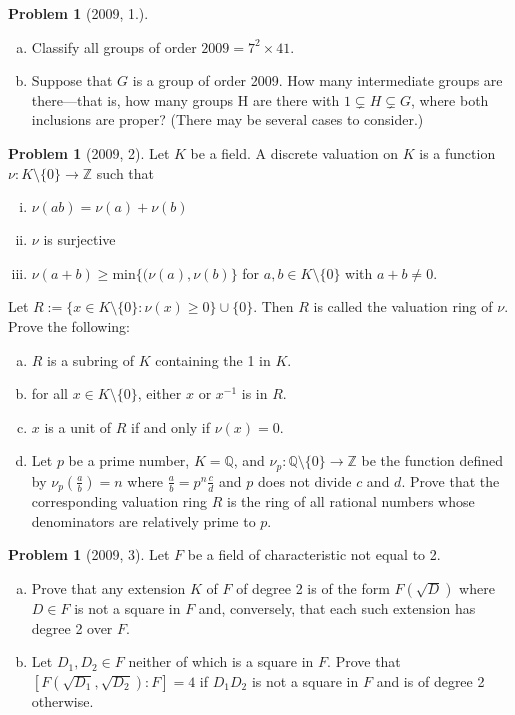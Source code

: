 \documentclass{article}
\newcommand{\inv}{^{-1}}
\newcommand{\<}{\langle} %
\renewcommand{\>}{\rangle} %
\theoremstyle{plain}
\theoremstyle{remark}
\theoremstyle{definition}
\newtheorem{examproblem}[equation]{Problem}
\begin{document}
\begin{examproblem}[2009, 1.]
	\begin{enumerate}[(a)]
		\item Classify all groups of order $2009=7^2\times 41$.
		\item Suppose that $G$ is a group of order 2009. How many intermediate groups are
	there—that is, how many groups H are there with $1\subsetneq H\subsetneq G$, where both
	inclusions are proper? (There may be several cases to consider.)
	\end{enumerate}
\end{examproblem}

\begin{examproblem}[2009, 2]
	Let $K$ be a field. A discrete valuation on $K$ is a function $\nu:
	K\setminus\{0\}\rightarrow\mathbb Z$ such that
	\begin{enumerate}[(i)]
		\item $\nu(ab)=\nu(a)+\nu(b)$
		\item $\nu$ is surjective
		\item $\nu(a+b)\geq\text{min}\{(\nu(a),\nu(b)\}$ for
			$a,b\in K\setminus\{0\}$ with $a+b\neq 0$.
	\end{enumerate}
	Let $R:=\{x\in K\setminus\{0\}:\nu(x)\geq0\}\cup\{0\}$. Then
	$R$ is called the valuation ring of $\nu$.
	Prove the following:
	\begin{enumerate}[(a)]
		\item $R$ is a subring of $K$ containing the 1 in $K$.
		\item for all $x\in K\setminus\{0\}$, either $x$ or
			$x\inv$ is in $R$.
		\item $x$ is a unit of $R$ if and only if $\nu(x)=0$.
		\item Let $p$ be a prime number, $K=\mathbb Q$,
			and $\nu_p:\mathbb Q\setminus\{0\}\rightarrow\mathbb Z$
			be the function defined by $\nu_p(\frac ab)=n$ where
			$\frac ab=p^n\frac cd$ and $p$ does not divide $c$ and $d$.
			Prove that the corresponding valuation ring $R$ is the ring
			of all rational numbers whose denominators are relatively
			prime to $p$.
	\end{enumerate}
\end{examproblem}

\begin{examproblem}[2009, 3]
	Let $F$ be a field of characteristic not equal to 2.
	\begin{enumerate}[(a)]
		\item Prove that any extension $K$ of $F$ of degree 2
			is of the form $F(\sqrt D)$ where $D\in F$
			is not a square in $F$ and, conversely, that each such
			extension has degree 2 over $F$.
		\item Let $D_1,D_2\in F$ neither of which is a square in $F$.
			Prove that $[F(\sqrt{D_1},\sqrt{D_2}):F]=4$ if
			$D_1D_2$ is not a square in $F$ and is of degree
			2 otherwise.
	\end{enumerate}
\end{examproblem}
\end{document}
